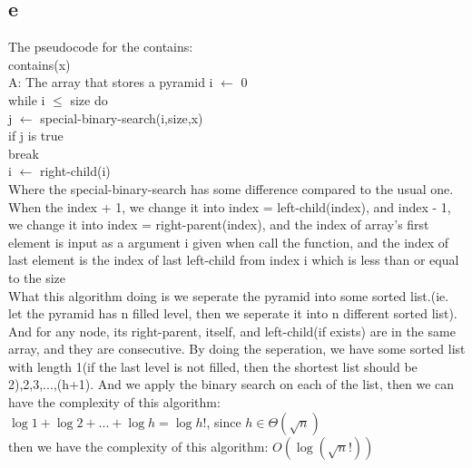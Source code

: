 \documentclass[12pt]{article}
\begin{document}
\begin{itemize}
		\part{e}
		The pseudocode for the contains:\\
		
		contains(x)\\
		A: The array that stores a pyramid
		i $\gets$ 0\\
		while i $\leq$ size do\\
		\hphantom{1111} j $\gets$ special-binary-search(i,size,x)\\
		\hphantom{1111} if j is true\\
		\hphantom{11111111} break\\
		\hphantom{1111} i $\gets$ right-child(i)\\
		
		Where the special-binary-search has some difference compared to the usual one. When the index + 1, we change it into index = left-child(index), and index - 1, we change it into index = right-parent(index), and the index of array's first element is input as a argument i given when call the function, and the index of last element is the index of last left-child from index i which is less than or equal to the size\\
		What this algorithm doing is we seperate the pyramid into some sorted list.(ie. let the pyramid has n filled level, then we seperate it into n different sorted list). And for any node, its right-parent, itself, and left-child(if exists) are in the same array, and they are consecutive. By doing the seperation, we have some sorted list with length 1(if the last level is not filled, then the shortest list should be 2),2,3,...,(h+1). And we apply the binary search on each of the list, then we can have the complexity of this algorithm:\\
		$\log 1 + \log 2 + ... + \log h = \log h!$, since $h\in \Theta(\sqrt {n})$\\
		then we have the complexity of this algorithm: $O(\log {(\sqrt{n}!)})$
	\end{itemize}
	
	
\end{document}

